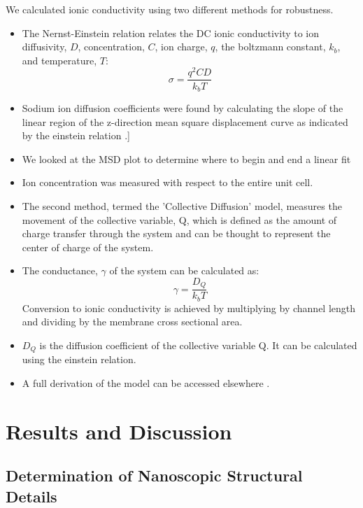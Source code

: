\documentclass{article}
\begin{document}
  We calculated ionic conductivity using two different methods for robustness.
  \begin{itemize}
    \item The Nernst-Einstein relation relates the DC ionic conductivity to 
    ion diffusivity, $D$, concentration, $C$, ion charge, $q$, the boltzmann 
    constant, $k_b$, and temperature, $T$: $$\sigma = \dfrac{q^2CD}{k_b T}$$  %
    \item Sodium ion diffusion coefficients were found by calculating the slope
    of the linear region of the z-direction mean square displacement curve as indicated by
    the einstein relation \cite{einstein_investigations_1956}.]
    \item We looked at the MSD plot to determine where to begin and end a linear fit
    \item Ion concentration was measured with respect to the entire unit cell. 
    \item The second method, termed the 'Collective Diffusion' model, measures 
    the movement of the collective variable, Q, which is defined as the amount
    of charge transfer through the system and can be thought to represent
    the center of charge of the system.
    \item The conductance, $\gamma$ of the system can be calculated as:
    $$ \gamma = \dfrac{D_Q}{k_b T} $$ Conversion to ionic conductivity is
    achieved by multiplying by channel length and dividing by the membrane
    cross sectional area.
    \item $D_Q$ is the diffusion coefficient of the collective variable Q. It can
    be calculated using the einstein relation.
    \item A full derivation of the model can be accessed elsewhere \cite{liu_collective_2013}.
  \end{itemize}
    
  \section*{Results and Discussion}
  
  \subsection*{Determination of Nanoscopic Structural Details}
  
\end{document}
